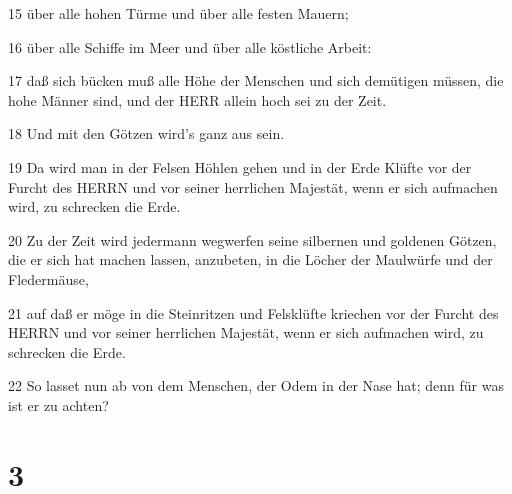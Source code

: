 \par 15 über alle hohen Türme und über alle festen Mauern;
\par 16 über alle Schiffe im Meer und über alle köstliche Arbeit:
\par 17 daß sich bücken muß alle Höhe der Menschen und sich demütigen müssen, die hohe Männer sind, und der HERR allein hoch sei zu der Zeit.
\par 18 Und mit den Götzen wird's ganz aus sein.
\par 19 Da wird man in der Felsen Höhlen gehen und in der Erde Klüfte vor der Furcht des HERRN und vor seiner herrlichen Majestät, wenn er sich aufmachen wird, zu schrecken die Erde.
\par 20 Zu der Zeit wird jedermann wegwerfen seine silbernen und goldenen Götzen, die er sich hat machen lassen, anzubeten, in die Löcher der Maulwürfe und der Fledermäuse,
\par 21 auf daß er möge in die Steinritzen und Felsklüfte kriechen vor der Furcht des HERRN und vor seiner herrlichen Majestät, wenn er sich aufmachen wird, zu schrecken die Erde.
\par 22 So lasset nun ab von dem Menschen, der Odem in der Nase hat; denn für was ist er zu achten?

\chapter{3}

